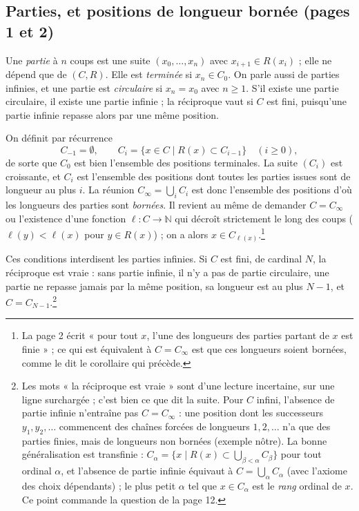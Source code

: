 \documentclass[11pt,a4paper]{article}
\begin{document}
\subsection*{Parties, et positions de longueur bornée (pages 1 et 2)}

Une \emph{partie} à $n$ coups est une suite $(x_0, \ldots, x_n)$ avec
$x_{i+1} \in R(x_i)$ ; elle ne dépend que de $(C, R)$. Elle est
\emph{terminée} si $x_n \in C_0$. On parle aussi de parties infinies, et une
partie est \emph{circulaire} si $x_n = x_0$ avec $n \geqslant 1$. S'il existe
une partie circulaire, il existe une partie infinie ; la réciproque vaut si
$C$ est fini, puisqu'une partie infinie repasse alors par une même position.

On définit par récurrence
\[
C_{-1} = \emptyset,
\qquad
C_i = \{x \in C \mid R(x) \subset C_{i-1}\} \quad (i \geqslant 0),
\]
de sorte que $C_0$ est bien l'ensemble des positions terminales. La suite
$(C_i)$ est croissante, et $C_i$ est l'ensemble des positions dont toutes les
parties issues sont de longueur au plus $i$. La réunion
$C_\infty = \bigcup_i C_i$ est donc l'ensemble des positions d'où les
longueurs des parties sont \emph{bornées}. Il revient au même de demander
$C = C_\infty$ ou l'existence d'une fonction $\ell : C \to \mathbb{N}$ qui
décroît strictement le long des coups ($\ell(y) < \ell(x)$ pour
$y \in R(x)$) ; on a alors $x \in C_{\ell(x)}$.\footnote{La page 2 écrit « pour
tout $x$, l'une des longueurs des parties partant de $x$ est finie » ; ce qui
est équivalent à $C = C_\infty$ est que ces longueurs soient bornées, comme le
dit le corollaire qui précède.}

Ces conditions interdisent les parties infinies. Si $C$ est fini, de cardinal
$N$, la réciproque est vraie : sans partie infinie, il n'y a pas de partie
circulaire, une partie ne repasse jamais par la même position, sa longueur est
au plus $N - 1$, et $C = C_{N-1}$.\footnote{Les mots « la réciproque est
vraie » sont d'une lecture incertaine, sur une ligne surchargée ; c'est bien
ce que dit la suite. Pour $C$ infini, l'absence de partie infinie
n'entraîne pas $C = C_\infty$ : une position dont les successeurs $y_1, y_2,
\ldots$ commencent des chaînes forcées de longueurs $1, 2, \ldots$ n'a que des
parties finies, mais de longueurs non bornées (exemple nôtre). La bonne
généralisation est transfinie : $C_\alpha = \{x \mid R(x) \subset
\bigcup_{\beta < \alpha} C_\beta\}$ pour tout ordinal $\alpha$, et l'absence
de partie infinie équivaut à $C = \bigcup_\alpha C_\alpha$ (avec l'axiome des
choix dépendants) ; le plus petit $\alpha$ tel que $x \in C_\alpha$ est le
\emph{rang} ordinal de $x$. Ce point commande la question de la page 12.}
\end{document}
